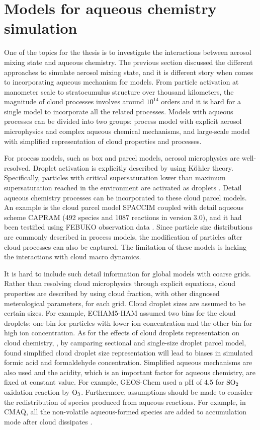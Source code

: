 \documentclass[edeposit,fullpage]{uiucthesis2009}
\begin{document}
\section{Models for aqueous chemistry simulation }
One of the topics for the thesis is to investigate the interactions between aerosol mixing state and aqueous chemistry. The previous section discussed the different approaches to simulate aerosol mixing state, and it is different story when comes to incorporating aqueous mechanism for models. From particle activation at manometer scale to stratocumulus structure over thousand kilometers, the magnitude of cloud processes involves around $10^{14}$ orders and it is hard for a single model to incorporate all the related processes. Models with aqueous processes can be divided into two groups: process model with explicit aerosol microphysics and complex aqueous chemical mechanisms, and large-scale model with simplified representation of cloud properties and processes. 

For process models, such as box and parcel models, aerosol microphysics are well-resolved. Droplet activation is explicitly described by using K$\rm \ddot{o}$hler theory. Specifically, particles with critical supersaturation lower than maximum supersaturation reached in the environment are activated as droplets \citep{rothenberg2016metamodeling, ching2012impacts}. Detail aqueous chemistry processes can be incorporated to these cloud parcel models. An example is the cloud parcel model SPACCIM coupled with detail aqueous scheme CAPRAM (492 species and 1087 reactions in version 3.0), and it had been testified using FEBUKO observation data \citep{wolke2005spaccim}. Since particle size distributions are commonly described in process models, the modification of particles after cloud processes can also be captured. The limitation of these models is lacking the interactions with cloud macro dynamics.

It is hard to include such detail information for global models with coarse grids. Rather than resolving cloud microphysics through explicit equations, cloud properties are described by using cloud fraction, with other diagnosed meterological parameters, for each grid. Cloud droplet sizes are assumed to be certain sizes. For example, ECHAM5-HAM assumed two bins for the cloud droplets: one bin for particles with lower ion concentration and the other bin for high ion concentration. As for the effects of cloud droplets representation on cloud chemistry, \citet{barth2006importance}, by camparing sectional and single-size droplet parcel model, found simplified cloud droplet size representation will lead to biases in simulated formic acid and formaldehyde concentration. Simplified aqueous mechanisms are also used and the acidity, which is an important factor for aqueous chemistry, are fixed at constant value. For example, GEOS-Chem used a pH of 4.5 for $\rm SO_2$ oxidation reaction by $\rm O_3$\citep{park2004natural}. Furthermore, assumptions should be made to consider the redistribution of species produced from aqueous reactions. For example, in CMAQ, all the non-volatile aqueous-formed species are added to accumulation mode after cloud dissipates \citep{binkowski2003models, fahey2017framework}. 
 
\end{document}
